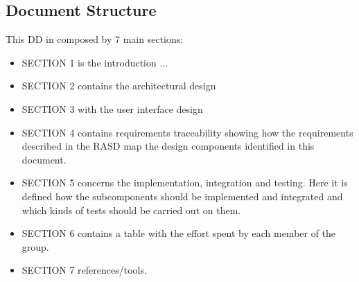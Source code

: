 	\subsection{Document Structure}
	This DD in composed by 7 main sections:
	\begin {itemize}
	 	\item SECTION 1 is the introduction ...
		\item SECTION 2 contains the architectural design
		\item SECTION 3 with the user interface design
		\item SECTION 4 contains requirements traceability showing how the requirements described in the RASD map the design components identified in this document.
		\item SECTION 5 concerns the implementation, integration and testing. Here it is defined how the subcomponents should be implemented and integrated and which kinds of tests should be carried out on them.
		\item SECTION 6 contains a table with the effort spent by each member of the group.
		\item SECTION 7 references/tools.
	\end{itemize}
	

